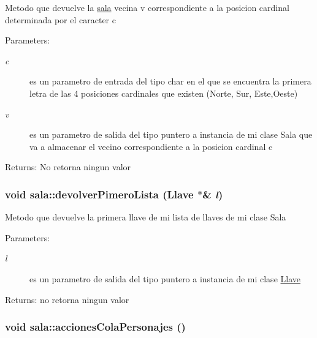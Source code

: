 Metodo que devuelve la \hyperlink{classsala}{sala} vecina v correspondiente a la posicion cardinal determinada por el caracter c \begin{Desc}
\item[Parameters:]
\begin{description}
\item[{\em c}]es un parametro de entrada del tipo char en el que se encuentra la primera letra de las 4 posiciones cardinales que existen (Norte, Sur, Este,Oeste) \item[{\em v}]es un parametro de salida del tipo puntero a instancia de mi clase Sala que va a almacenar el vecino correspondiente a la posicion cardinal c \end{description}
\end{Desc}
\begin{Desc}
\item[Returns:]No retorna ningun valor \end{Desc}
\hypertarget{classsala_376c8d9684f212f6e8a8d8316f2ab733}{
\subsubsection[devolverPimeroLista]{\setlength{\rightskip}{0pt plus 5cm}void sala::devolverPimeroLista ({\bf Llave} $\ast$\& {\em l})}}
\label{classsala_376c8d9684f212f6e8a8d8316f2ab733}


Metodo que devuelve la primera llave de mi lista de llaves de mi clase Sala \begin{Desc}
\item[Parameters:]
\begin{description}
\item[{\em l}]es un parametro de salida del tipo puntero a instancia de mi clase \hyperlink{classLlave}{Llave} \end{description}
\end{Desc}
\begin{Desc}
\item[Returns:]no retorna ningun valor \end{Desc}
\hypertarget{classsala_feef4f1219a7a014f58415eae0ff2e2b}{
\subsubsection[accionesColaPersonajes]{\setlength{\rightskip}{0pt plus 5cm}void sala::accionesColaPersonajes ()}}
\label{classsala_feef4f1219a7a014f58415eae0ff2e2b}


